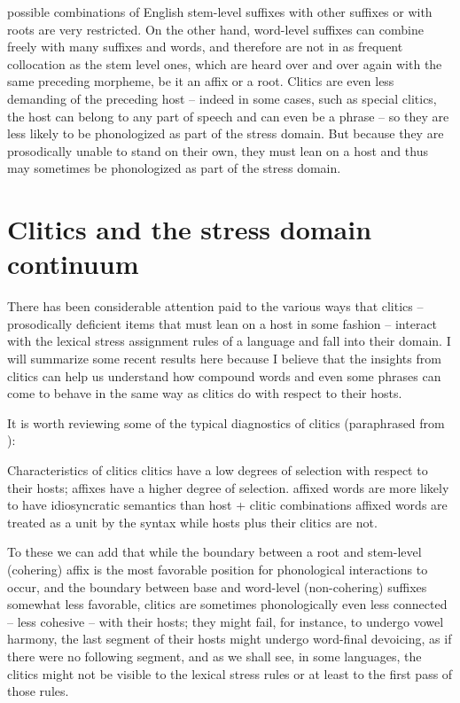 \documentclass[output=paper,
modfonts
]{LSP/langsci}
\begin{document}
possible combinations of English stem-level suffixes with other suffixes or with roots are very restricted. On the other hand, word-level suffixes can combine freely with many suffixes and words, and therefore are not in as frequent collocation as the stem level ones, which are heard over and over again with the same preceding morpheme, be it an affix or a root. Clitics are even less demanding of the preceding host -- indeed in some cases, such as special clitics, the host can belong to any part of speech and can even be a phrase -- so they are less likely to be phonologized as part of the stress domain. But because they are prosodically unable to stand on their own, they must lean on a host and thus may sometimes be phonologized as part of the stress domain. 

\section[Clitics and the stress domain continuum]{Clitics and the stress domain continuum}

There has been considerable attention paid to the various ways that clitics -- prosodically deficient items that must lean on a host in some fashion -- interact with the lexical stress assignment rules of a language and fall into their domain. I will summarize some recent results here because I believe that the insights from clitics can help us understand how compound words and even some phrases can come to behave in the same way as clitics do with respect to their hosts.

It is worth reviewing some of the typical diagnostics of clitics (paraphrased from \citealt{zwickypullum1983}):

\ea Characteristics of clitics
	\ea clitics have a low degrees of selection with respect to their hosts; affixes have a higher degree of selection. 
	\ex affixed words are more likely to have idiosyncratic semantics than host + clitic combinations
	\ex affixed words are treated as a unit by the syntax while hosts plus their clitics are not. 
	\z
\z

\noindent To these we can add that while the boundary between a root and stem-level (cohering) affix is the most favorable position for phonological interactions to occur, and the boundary between base and word-level (non-cohering) suffixes somewhat less favorable, clitics are sometimes phonologically even less connected -- less cohesive -- with their hosts; they might fail, for instance, to undergo vowel harmony, the last segment of their hosts might undergo word-final devoicing, as if there were no following segment, and as we shall see, in some languages, the clitics might not be visible to the lexical stress rules or at least to the first pass of those rules.
\end{document}
